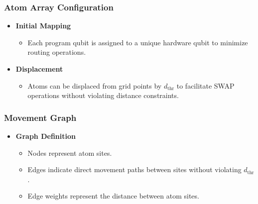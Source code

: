 \documentclass[18 pt]{beamer}
\begin{document}
\begin{frame}
    \frametitle{Atom Array Configuration}
    \begin{itemize}
        \item \textbf{Initial Mapping}
        \begin{itemize}
            \item Each program qubit is assigned to a unique hardware qubit to minimize routing operations.
        \end{itemize}
        \item \textbf{Displacement}
        \begin{itemize}
            \item Atoms can be displaced from grid points by $d_{\text{thr}}$ to facilitate SWAP operations without violating distance constraints.
        \end{itemize}
    \end{itemize}
\end{frame}

\begin{frame}
    \frametitle{Movement Graph}
    \begin{itemize}
        \item \textbf{Graph Definition}
        \begin{itemize}
            \item Nodes represent atom sites.
            \item Edges indicate direct movement paths between sites without violating $d_{\text{thr}}$.
            \item Edge weights represent the distance between atom sites.
        \end{itemize}
    \end{itemize}
\end{frame}
\end{document}
